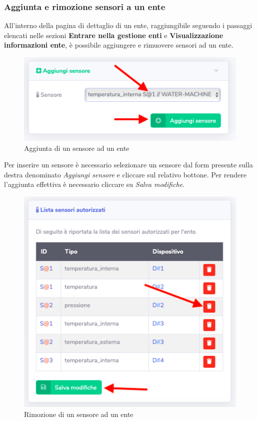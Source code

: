 	\subsubsection{Aggiunta e rimozione sensori a un ente}

		All'interno della pagina di dettaglio di un ente, raggiungibile seguendo i passaggi elencati nelle sezioni \textbf{Entrare nella gestione enti} e \textbf{Visualizzazione informazioni ente}, è possibile aggiungere e rimuovere sensori ad un ente.

		\begin{figure}[H]
		\centering
		\includegraphics[scale=0.600]{res/images/admin/aggSensoreEnte.png}
		\caption{Aggiunta di un sensore ad un ente}
	\end{figure}
	Per inserire un sensore è necessario selezionare un sensore dal form presente sulla destra denominato \textit{Aggiungi sensore} e cliccare sul relativo bottone. Per rendere l'aggiunta effettiva è necessario cliccare su \textit{Salva modifiche}. 

		\begin{figure}[H]
		\centering
		\includegraphics[scale=0.600]{res/images/admin/rimSensoreEnte.png}
		\caption{Rimozione di un sensore ad un ente}
	\end{figure}

